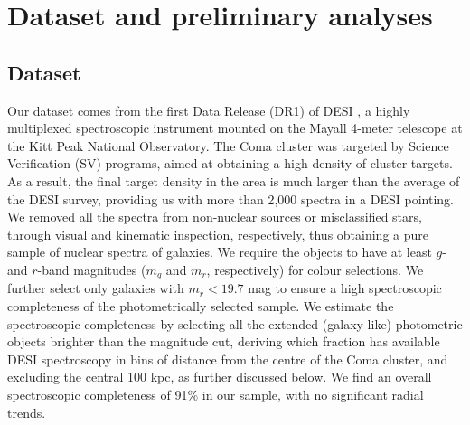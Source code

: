 \documentclass{aa}
\begin{document}
\section{Dataset and preliminary analyses}
\label{methods}


\subsection{Dataset}
\label{subsec:dataset}

Our dataset comes from the first Data Release (DR1) of DESI \citep{DESI_DR1}, a highly multiplexed spectroscopic instrument mounted on the Mayall 4-meter telescope at the Kitt Peak National Observatory. The Coma cluster was targeted by Science Verification (SV) programs, aimed at obtaining a high density of cluster targets. As a result, the final target density in the area is much larger than the average of the DESI survey, providing us with more than 2,000 spectra in a DESI pointing. We removed all the spectra from non-nuclear sources or misclassified stars, through visual and kinematic inspection, respectively, thus obtaining a pure sample of nuclear spectra of galaxies.
We require the objects to have at least $g$- and $r$-band magnitudes ($m_g$ and $m_r$, respectively) for colour selections. We further select only galaxies with $m_r <19.7$ mag to ensure a high spectroscopic completeness of the photometrically selected sample. We estimate the spectroscopic completeness by selecting all the extended (galaxy-like) photometric objects brighter than the magnitude cut, deriving which fraction has available DESI spectroscopy in bins of distance from the centre of the Coma cluster, and excluding the central 100 kpc, as further discussed below. We find an overall spectroscopic completeness of 91\% in our sample, with no significant radial trends.
\end{document}

